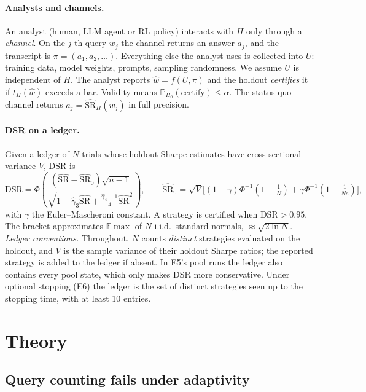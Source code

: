 \documentclass[11pt]{article}
\theoremstyle{definition}
\theoremstyle{remark}
\newcommand{\E}{\mathbb{E}}
\newcommand{\Prob}{\mathbb{P}}
\newcommand{\SR}{\widehat{\mathrm{SR}}}
\newcommand{\tH}{t_{H}}
\begin{document}
\paragraph{Analysts and channels.} An analyst (human, LLM agent or RL policy) interacts with $H$ only through a \emph{channel}. On the $j$-th query $w_j$ the channel returns an answer $a_j$, and the transcript is $\pi=(a_1,a_2,\dots)$. Everything else the analyst uses is collected into $U$: training data, model weights, prompts, sampling randomness. We assume $U$ is independent of $H$. The analyst reports $\hat w=f(U,\pi)$ and the holdout \emph{certifies} it if $\tH(\hat w)$ exceeds a bar. Validity means $\Prob_{H_0}(\text{certify})\le\alpha$. The status-quo channel returns $a_j=\SR_H(w_j)$ in full precision.

\paragraph{DSR on a ledger.} Given a ledger of $N$ trials whose holdout Sharpe estimates have cross-sectional variance $V$, DSR \citep{bailey2014deflated} is
\begin{equation}\label{eq:dsr}
\mathrm{DSR}=\Phi\!\left(\frac{(\SR-\SR_0)\sqrt{n-1}}{\sqrt{1-\hat\gamma_3\SR+\tfrac{\hat\gamma_4-1}{4}\SR^2}}\right),\qquad
\SR_0=\sqrt V\Big[(1-\gamma)\Phi^{-1}(1-\tfrac1N)+\gamma\Phi^{-1}(1-\tfrac1{Ne})\Big],
\end{equation}
with $\gamma$ the Euler--Mascheroni constant. A strategy is certified when $\mathrm{DSR}>0.95$. The bracket approximates $\E\max$ of $N$ i.i.d.\ standard normals, $\approx\sqrt{2\ln N}$. \emph{Ledger conventions.} Throughout, $N$ counts \emph{distinct} strategies evaluated on the holdout, and $V$ is the sample variance of their holdout Sharpe ratios; the reported strategy is added to the ledger if absent. In E5's pool runs the ledger also contains every pool state, which only makes DSR more conservative. Under optional stopping (E6) the ledger is the set of distinct strategies seen up to the stopping time, with at least 10 entries.

\section{Theory}
\subsection{Query counting fails under adaptivity}
\end{document}
